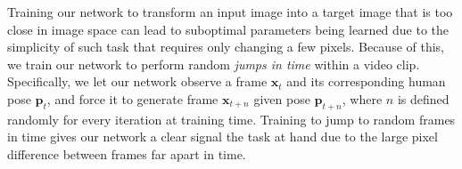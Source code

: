 \documentclass{article}
\newcommand{\x}{{\mathbf{x}}}
\newcommand{\p}{{\mathbf{p}}}
\newcommand{\cutsubsectionup}{\vspace*{-0.09in}}
\newcommand{\cutsubsectiondown}{\vspace*{-0.04in}}
\newcommand{\cutsubsectionup}{}
\newcommand{\cutsubsectiondown}{}
\begin{document}
Training our network to transform an input image into a target image that is too close in image space can lead to suboptimal parameters being learned due to the simplicity of such task that requires only changing a few pixels.
Because of this, we train our network to perform random \textit{jumps in time} within a video clip.
Specifically, we let our network observe a frame $\x_t$ and its corresponding human pose $\p_t$, and force it to generate frame $\x_{t+n}$ given pose $\p_{t+n}$, where $n$ is defined randomly for every iteration at training time.
Training to jump to random frames in time gives our network a clear signal the task at hand due to the large pixel difference between frames far apart in time.
\end{document}

